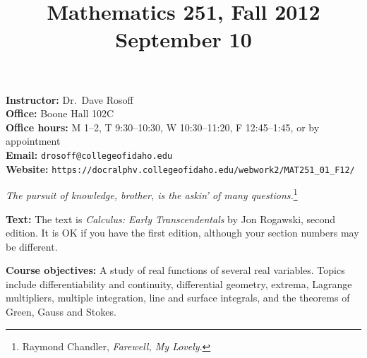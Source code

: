 \documentclass[12pt,twoside]{amsart}
\title{{\Large Mathematics 251, Fall 2012 \\ September 10}}
\begin{document}
\maketitle
\thispagestyle{empty}


\textbf{Instructor:} Dr.\ Dave Rosoff  \\
\textbf{Office:} Boone Hall 102C \\
\textbf{Office hours:} M 1--2, T 9:30--10:30, W 10:30--11:20, F 12:45--1:45, or by appointment \hspace*{0.25in}\\
\textbf{Email:} \verb[drosoff@collegeofidaho.edu[ \\
\textbf{Website:} \verb]https://docralphv.collegeofidaho.edu/webwork2/MAT251_01_F12/]
\begin{center}

{\large \emph{The pursuit of knowledge, brother, is the askin' of many questions.}\footnote{Raymond Chandler, \emph{Farewell, My Lovely}.}}

\end{center}
\textbf{Text:} The text is \emph{Calculus: Early Transcendentals} by Jon Rogawski, second edition. It is OK if you have the first edition, although your section numbers may be different.

\textbf{Course objectives:} A study of real functions of several real variables. Topics include differentiability and continuity, differential geometry, extrema, Lagrange multipliers, multiple integration, line and surface integrals, and the theorems of Green, Gauss and Stokes. %
\end{document}
